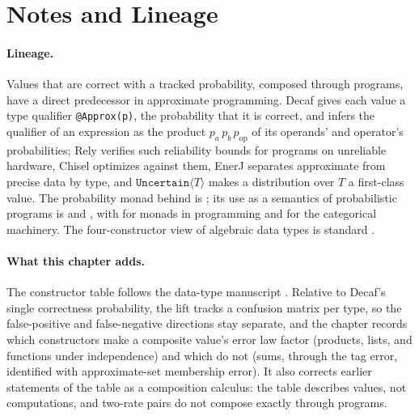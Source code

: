 %

\section{Notes and Lineage}
\label{sec:bib-notes-ch13}

\paragraph{Lineage.}
Values that are correct with a tracked probability, composed through programs,
have a direct predecessor in approximate programming. Decaf
\parencite{boston-et-al-2015} gives each value a type qualifier
\texttt{@Approx(p)}, the probability that it is correct, and infers the
qualifier of an expression as the product $p_a\, p_b\, p_{\mathrm{op}}$ of its
operands' and operator's probabilities; Rely
\parencite{carbin-misailovic-rinard-2013} verifies such reliability bounds for
programs on unreliable hardware, Chisel \parencite{misailovic-et-al-2014}
optimizes against them, EnerJ \parencite{sampson-et-al-2011} separates approximate
from precise data by type, and $\mathtt{Uncertain}\langle T\rangle$
\parencite{bornholt-mytkowicz-mckinley-2014} makes a distribution over $T$ a
first-class value. The probability monad behind  is
\textcite{giry-1982}; its use as a semantics of probabilistic programs is
\textcite{kozen-1981} and \textcite{ramsey-pfeffer-2002}, with
\textcite{wadler-1992} for monads in programming and \textcite{maclane-categories}
for the categorical machinery. The four-constructor view of algebraic data types
is standard \parencite{hudak-1989}.

\paragraph{What this chapter adds.}
The constructor table follows the data-type manuscript
\textcite{towell-bernoulli-data-type}. Relative to Decaf's single correctness
probability, the lift tracks a confusion matrix per type, so the false-positive
and false-negative directions stay separate, and the chapter records which
constructors make a composite value's error law factor (products, lists, and
functions under independence) and which do not (sums, through the tag error,
identified with approximate-set membership error). It also corrects earlier
statements of the table as a composition calculus: the table describes values,
not computations, and two-rate pairs do not compose exactly through programs.

